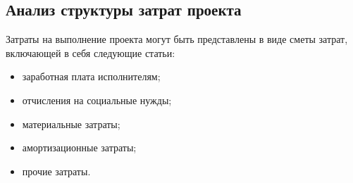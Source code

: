 \subsection{Анализ структуры затрат проекта} \label{costs_analysus}

Затраты на выполнение проекта могут быть представлены в виде сметы затрат, включающей в себя следующие статьи:
\begin{itemize}
	\item заработная плата исполнителям;
	\item отчисления на социальные нужды;
	\item материальные затраты;
	\item амортизационные затраты;
	\item прочие затраты.
\end{itemize}